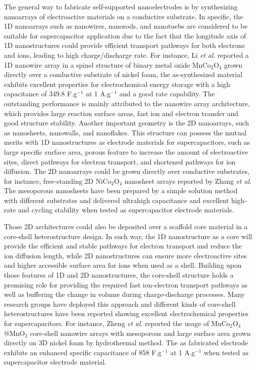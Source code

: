 \documentclass[reprint,amsmath,amssymb,aps,floatfix,
]{revtex4-2}
\begin{document}
The general way to fabricate self-supported nanoelectrodes is by synthesizing nanoarrays of electroactive materials on a conductive substrate. In specific, the 1D nanoarrays such as nanowires, nanorods, and nanotuebs are considered to be suitable for supercapacitor application due to the fact that the longitude axis of 1D nanostructures could provide efficient transport pathways for both electrons and ions, leading to high charge/discharge rate.\cite{Liqiang2014} For instance, Li {\it et al}. reported a 1D nanowire array in a  spinel structure of binary metal oxide MnCo$_2$O$_4$ grown directly over a conductive substrate of nickel foam,\cite{Lihaixiong2014} the as-synthesized material exhibits excellent properties for electrochemical energy storage with a high capacitance of 349.8 F.g$^{-1}$ at 1 A.g$^{-1}$ and a good rate capability. The outstanding performance is mainly attributed to the nanowire array architecture, which provides large reaction surface areas, fast ion and electron transfer and good structure stability. Another important geometry is the 2D nanoarrays, such as nanosheets, nanowalls, and nanoflakes. This structure can possess the mutual merits with 1D nanostructures as electrode materials for supercapacitors, such as large specific surface area, porous feature to increase the amount of electroactive sites, direct pathways for electron transport, and shortened pathways for ion diffusion.\cite{Dubal2014} The 2D nanoarrays could be grown directly over conductive substrates, for instance, free-standing 2D NiCo$_2$O$_4$ nanosheet arrays reported by Zhang {\it et al}. The mesoporous nanosheets have been prepared by a simple solution method with different substrates and delivered ultrahigh capacitance and excellent high-rate and cycling stability when tested as supercapacitor electrode materials.\cite{Zhang2013} 

Those 2D architectures could also be deposited over a scaffold core material in a core-shell heterostructure design. In such way, the 1D nanostructure as a core will provide the efficient and stable pathways for electron transport and reduce the ion diffusion length, while 2D nanostructures can ensure more electroactive sites and higher accessible surface area for ions when used as a shell. Building upon those features of 1D and 2D nanostructures, the core-shell structure holds a promising role for providing the required fast ion-electron transport pathways as well as buffering the change in volume during charge-discharge processes. Many research groups have deployed this approach and different kinds of core-shell heterostructures have been reported showing excellent electrochemical properties for supercapacitors. For instance, Zheng {\it et al}. reported the usage of MnCo$_2$O$_4${@}MnO$_2$ core-shell nanowire arrays with mesoporous and large surface area grown directly on 3D nickel foam by hydrothermal method. The as fabricated electrode exhibits an enhanced specific capacitance of 858 F.g$^{-1}$ at 1 A.g$^{-1}$ when tested as supercapacitor electrode material.\cite{Xiaoting2016}
\end{document}
